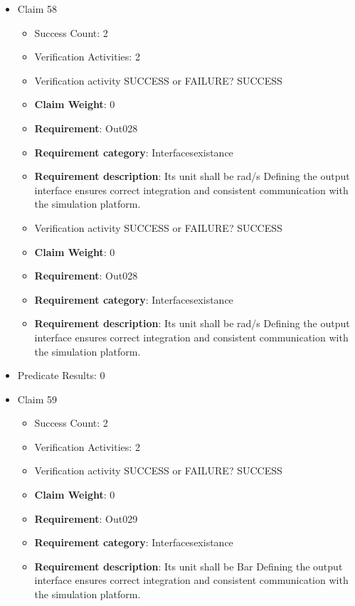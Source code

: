 \documentclass{article}
\begin{document}
\begin{itemize}
  				  \item Claim 58
				\begin{itemize}
			    	\item Success Count: 2 
			    	\item Verification Activities: 2
					\item Verification activity SUCCESS or FAILURE? SUCCESS
					\item \textbf{Claim Weight}: 0
						\item \textbf{Requirement}: Out028 
						\item \textbf{Requirement category}: Interfacesexistance 
						\item \textbf{Requirement description}: Its unit shall be rad/s Defining the output interface ensures correct integration and consistent communication with the simulation platform.
					
					\item Verification activity SUCCESS or FAILURE? SUCCESS
					\item \textbf{Claim Weight}: 0
						\item \textbf{Requirement}: Out028 
						\item \textbf{Requirement category}: Interfacesexistance 
						\item \textbf{Requirement description}: Its unit shall be rad/s Defining the output interface ensures correct integration and consistent communication with the simulation platform.
					
				\end{itemize}
				
									    
				\item Predicate Results: 0

  				  \item Claim 59
				\begin{itemize}
			    	\item Success Count: 2 
			    	\item Verification Activities: 2
					\item Verification activity SUCCESS or FAILURE? SUCCESS
					\item \textbf{Claim Weight}: 0
						\item \textbf{Requirement}: Out029 
						\item \textbf{Requirement category}: Interfacesexistance 
						\item \textbf{Requirement description}: Its unit shall be Bar Defining the output interface ensures correct integration and consistent communication with the simulation platform.
					

\end{itemize}
\end{itemize}
\end{document}
